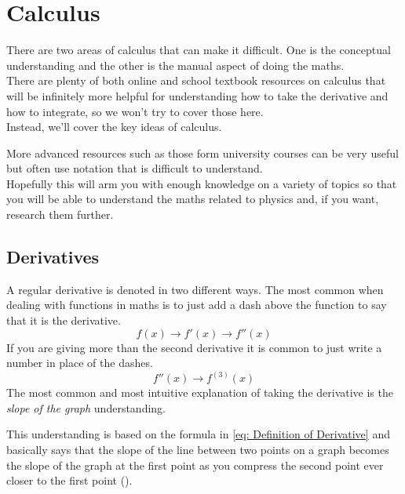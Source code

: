 \documentclass[main.tex]{subfiles}
\begin{document}

    \chapter{Calculus}
        \label{ch: Calculus}
        \thispagestyle{noheader}


        There are two areas of calculus that can make it difficult. One is the conceptual understanding and the other is the manual aspect of doing the maths.\\
        There are plenty of both online and school textbook resources on calculus that will be infinitely more helpful for understanding how to take the derivative and how to integrate, so we won't try to cover those here.\\
        Instead, we'll cover the key ideas of calculus.

        More advanced resources such as those form university courses can be very useful but often use notation that is difficult to understand.\\
        Hopefully this will arm you with enough knowledge on a variety of topics so that you will be able to understand the maths related to physics and, if you want, research them further.


        \section{Derivatives}
            \label{sec: Derivatives}
            
            
            A regular derivative is denoted in two different ways. The most common when dealing with functions in maths is to just add a dash above the function to say that it is the derivative.
            \begin{equation*}
                f(x) \rightarrow f'(x) \rightarrow f''(x)
            \end{equation*}
            If you are giving more than the second derivative it is common to just write a number in place of the dashes.
            \begin{equation*}
                f''(x) \to f^{(3)}(x)
            \end{equation*}
            The most common and most intuitive explanation of taking the derivative is the \textit{slope of the graph} understanding.

            This understanding is based on the formula in \eqref{eq: Definition of Derivative} and basically says that the slope of the line between two points on a graph becomes the slope of the graph at the first point as you compress the second point ever closer to the first point ().
\end{document}
